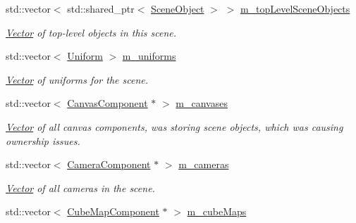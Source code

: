 \begin{Indent}
\begin{DoxyCompactItemize}
std\+::vector$<$ std\+::shared\+\_\+ptr$<$ \mbox{\hyperlink{classrev_1_1_scene_object}{Scene\+Object}} $>$ $>$ \mbox{\hyperlink{classrev_1_1_scene_aa224ac3c09a8ceb03d9fa7f6ca3540de}{m\+\_\+top\+Level\+Scene\+Objects}}
\begin{DoxyCompactList}\small\item\em \mbox{\hyperlink{classrev_1_1_vector}{Vector}} of top-\/level objects in this scene. \end{DoxyCompactList}\item 
\mbox{\label{classrev_1_1_scene_a22aa63d75de9c391f34e38d1f7b0a66d}} 
std\+::vector$<$ \mbox{\hyperlink{structrev_1_1_uniform}{Uniform}} $>$ \mbox{\hyperlink{classrev_1_1_scene_a22aa63d75de9c391f34e38d1f7b0a66d}{m\+\_\+uniforms}}
\begin{DoxyCompactList}\small\item\em \mbox{\hyperlink{classrev_1_1_vector}{Vector}} of uniforms for the scene. \end{DoxyCompactList}\item 
\mbox{\label{classrev_1_1_scene_aa997d96f8254396a7ce8cfe8b5c088be}} 
std\+::vector$<$ \mbox{\hyperlink{classrev_1_1_canvas_component}{Canvas\+Component}} $\ast$ $>$ \mbox{\hyperlink{classrev_1_1_scene_aa997d96f8254396a7ce8cfe8b5c088be}{m\+\_\+canvases}}
\begin{DoxyCompactList}\small\item\em \mbox{\hyperlink{classrev_1_1_vector}{Vector}} of all canvas components, was storing scene objects, which was causing ownership issues. \end{DoxyCompactList}\item 
\mbox{\label{classrev_1_1_scene_a9f94a314b4dbd703663c1593ef8ca45e}} 
std\+::vector$<$ \mbox{\hyperlink{classrev_1_1_camera_component}{Camera\+Component}} $\ast$ $>$ \mbox{\hyperlink{classrev_1_1_scene_a9f94a314b4dbd703663c1593ef8ca45e}{m\+\_\+cameras}}
\begin{DoxyCompactList}\small\item\em \mbox{\hyperlink{classrev_1_1_vector}{Vector}} of all cameras in the scene. \end{DoxyCompactList}\item 
\mbox{\label{classrev_1_1_scene_aef7ccf729c345de08e1e63d020862dfd}} 
std\+::vector$<$ \mbox{\hyperlink{classrev_1_1_cube_map_component}{Cube\+Map\+Component}} $\ast$ $>$ \mbox{\hyperlink{classrev_1_1_scene_aef7ccf729c345de08e1e63d020862dfd}{m\+\_\+cube\+Maps}}

\end{DoxyCompactItemize}
\end{Indent}
